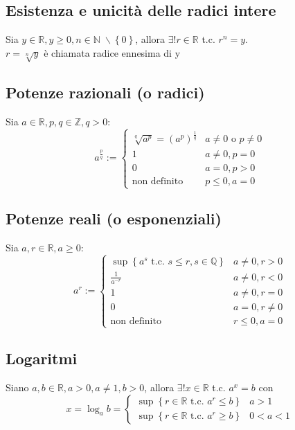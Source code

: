 \documentclass[a4paper]{article}
\begin{document}
\subsection{Esistenza e unicità delle radici intere}
Sia \(y \in \mathbb{R}, y \geq 0, n \in \mathbb{N} \; \backslash \left\{ 0 \right\} \), allora \(\exists! r \in \mathbb{R}\) t.c. \(r ^ n = y\).\\
\(r = \sqrt[n]{y} \) è chiamata radice ennesima di y

\subsection{Potenze razionali (o radici)}
Sia \(a \in \mathbb{R}, p, q \in \mathbb{Z}, q > 0\):
\[ a ^ \frac{p}{q} := 
\begin{cases}
	\sqrt[q]{a ^ p} = \left( a ^ p \right) ^ \frac{1}{q} & a \neq 0 \text{ o } p \neq 0 \\
	1 & a \neq 0, p = 0 \\
	0 & a = 0, p > 0 \\
	\text{non definito} & p \leq 0, a = 0
\end{cases}
\]

\subsection{Potenze reali (o esponenziali)}
Sia \(a,r \in \mathbb{R}, a \geq 0\):
\[ a ^ r := 
\begin{cases}
	\sup \left\{a ^ s \text{ t.c. } s \leq r, s \in \mathbb{Q} \right\} & a \neq 0, r > 0 \\
	\displaystyle \frac{1}{a ^ {-r}} & a \neq 0, r < 0 \\
	1 & a \neq 0, r = 0 \\
	0 & a = 0, r \neq 0 \\
	\text{non definito} & r \leq 0, a = 0
\end{cases}
\]

\subsection{Logaritmi}
Siano \(a,b \in \mathbb{R}, a > 0, a \neq 1, b > 0\), allora \(\exists!  x \in \mathbb{R}\) t.c. \(a ^ x = b\) con
\[ x = \log_a b = 
\begin{cases}
	\sup  \left\{ r \in \mathbb{R} \text{ t.c. } a ^ r \leq b \right\} & a > 1 \\
	\sup  \left\{ r \in \mathbb{R} \text{ t.c. } a ^ r \geq b \right\} & 0 < a < 1
\end{cases}
\]
\end{document}
